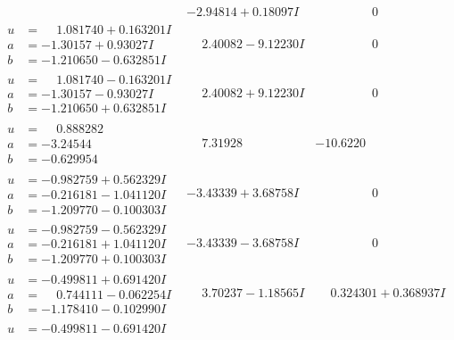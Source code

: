 \documentclass[1p]{elsarticle_modified}
\theoremstyle{definition}
\begin{document}
$$\begin{array}{c|c|c}
 & -2.94814 + 0.18097 I & \phantom{-0.000000 } 0 \\ \hline\begin{aligned}
u &= \phantom{-}1.081740 + 0.163201 I \\
a &= -1.30157 + 0.93027 I \\
b &= -1.210650 - 0.632851 I\end{aligned}
 & \phantom{-}2.40082 - 9.12230 I & \phantom{-0.000000 } 0 \\ \hline\begin{aligned}
u &= \phantom{-}1.081740 - 0.163201 I \\
a &= -1.30157 - 0.93027 I \\
b &= -1.210650 + 0.632851 I\end{aligned}
 & \phantom{-}2.40082 + 9.12230 I & \phantom{-0.000000 } 0 \\ \hline\begin{aligned}
u &= \phantom{-}0.888282\phantom{ +0.000000I} \\
a &= -3.24544\phantom{ +0.000000I} \\
b &= -0.629954\phantom{ +0.000000I}\end{aligned}
 & \phantom{-}7.31928\phantom{ +0.000000I} & -10.6220\phantom{ +0.000000I} \\ \hline\begin{aligned}
u &= -0.982759 + 0.562329 I \\
a &= -0.216181 - 1.041120 I \\
b &= -1.209770 - 0.100303 I\end{aligned}
 & -3.43339 + 3.68758 I & \phantom{-0.000000 } 0 \\ \hline\begin{aligned}
u &= -0.982759 - 0.562329 I \\
a &= -0.216181 + 1.041120 I \\
b &= -1.209770 + 0.100303 I\end{aligned}
 & -3.43339 - 3.68758 I & \phantom{-0.000000 } 0 \\ \hline\begin{aligned}
u &= -0.499811 + 0.691420 I \\
a &= \phantom{-}0.744111 - 0.062254 I \\
b &= -1.178410 - 0.102990 I\end{aligned}
 & \phantom{-}3.70237 - 1.18565 I & \phantom{-}0.324301 + 0.368937 I \\ \hline\begin{aligned}
u &= -0.499811 - 0.691420 I \\

\end{aligned}
\end{array}$$
\end{document}
